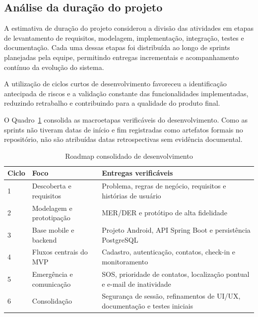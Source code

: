 \subsection{Análise da duração do projeto}

A estimativa de duração do projeto considerou a divisão das atividades em etapas de levantamento de requisitos, modelagem, implementação, integração, testes e documentação. Cada uma dessas etapas foi distribuída ao longo de sprints planejadas pela equipe, permitindo entregas incrementais e acompanhamento contínuo da evolução do sistema.

A utilização de ciclos curtos de desenvolvimento favoreceu a identificação antecipada de riscos e a validação constante das funcionalidades implementadas, reduzindo retrabalho e contribuindo para a qualidade do produto final.

O Quadro~\ref{tab_roadmap} consolida as macroetapas verificáveis do desenvolvimento. Como as sprints não tiveram datas de início e fim registradas como artefatos formais no repositório, não são atribuídas datas retrospectivas sem evidência documental.

\begin{table}[H]
\caption{Roadmap consolidado de desenvolvimento}
\label{tab_roadmap}
\centering
\footnotesize
\begin{tabular}{p{2cm}p{5cm}p{6.5cm}}
\hline
\textbf{Ciclo} & \textbf{Foco} & \textbf{Entregas verificáveis} \\
\hline
1 & Descoberta e requisitos & Problema, regras de negócio, requisitos e histórias de usuário \\
2 & Modelagem e prototipação & MER/DER e protótipo de alta fidelidade \\
3 & Base mobile e backend & Projeto Android, API Spring Boot e persistência PostgreSQL \\
4 & Fluxos centrais do MVP & Cadastro, autenticação, contatos, check-in e monitoramento \\
5 & Emergência e comunicação & SOS, prioridade de contatos, localização pontual e e-mail de inatividade \\
6 & Consolidação & Segurança de sessão, refinamentos de UI/UX, documentação e testes iniciais \\
\hline
\end{tabular}
\end{table}